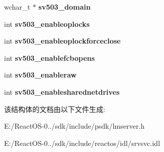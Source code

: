 \begin{DoxyCompactItemize}
wchar\+\_\+t $\ast$ {\bfseries sv503\+\_\+domain}
\item 
\mbox{\label{struct___s_e_r_v_e_r___i_n_f_o__503_ac3d7eebe1aadb74ade0e3cced5fc9cc7}} 
int {\bfseries sv503\+\_\+enableoplocks}
\item 
\mbox{\label{struct___s_e_r_v_e_r___i_n_f_o__503_a38fd9f332f3af868f4669878b99ade53}} 
int {\bfseries sv503\+\_\+enableoplockforceclose}
\item 
\mbox{\label{struct___s_e_r_v_e_r___i_n_f_o__503_a5c18fbee700a4f5382bcbdc7fd4b9668}} 
int {\bfseries sv503\+\_\+enablefcbopens}
\item 
\mbox{\label{struct___s_e_r_v_e_r___i_n_f_o__503_a10f056df23e217da56bb75d2d356feaf}} 
int {\bfseries sv503\+\_\+enableraw}
\item 
\mbox{\label{struct___s_e_r_v_e_r___i_n_f_o__503_ad406263fa97bdae45b3f801e7e6e4d40}} 
int {\bfseries sv503\+\_\+enablesharednetdrives}
\end{DoxyCompactItemize}


该结构体的文档由以下文件生成\+:\begin{DoxyCompactItemize}
\item 
E\+:/\+React\+O\+S-\/0../sdk/include/psdk/lmserver.\+h\item 
E\+:/\+React\+O\+S-\/0../sdk/include/reactos/idl/srvsvc.\+idl\end{DoxyCompactItemize}
